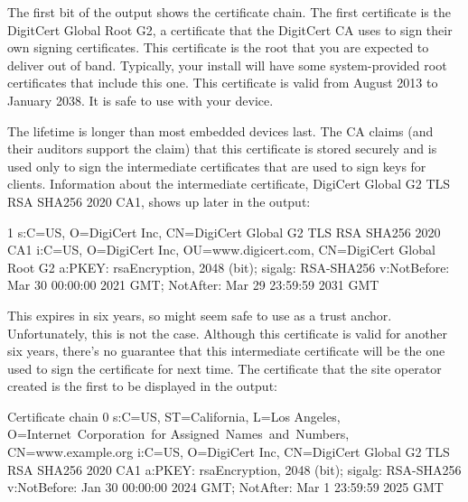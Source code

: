 
The first bit of the output shows the certificate chain.
The first certificate is the DigitCert Global Root G2, a certificate that the DigitCert CA uses to sign their own signing certificates.
This certificate is the root that you are expected to deliver out of band.
Typically, your  install will have some system-provided root certificates that include this one.
This certificate is valid from August 2013 to January 2038.
It is  safe to use with your device.

The lifetime is longer than most embedded devices last.
The CA claims (and their auditors support the claim) that this certificate is stored securely and is used only to sign the intermediate certificates that are used to sign keys for clients.
Information about the intermediate certificate, DigiCert Global G2 TLS RSA SHA256 2020 CA1, shows up later in the output:

\begin{console}
 1 s:C=US, O=DigiCert Inc, CN=DigiCert Global G2 TLS RSA SHA256 2020 CA1
   i:C=US, O=DigiCert Inc, OU=www.digicert.com, CN=DigiCert Global Root G2
   a:PKEY: rsaEncryption, 2048 (bit); sigalg: RSA-SHA256
   v:NotBefore: Mar 30 00:00:00 2021 GMT; NotAfter: Mar 29 23:59:59 2031 GMT
\end{console}

This expires in six years, so might seem safe to use as a trust anchor.
Unfortunately, this is not the case.
Although this certificate is valid for another six years, there's no guarantee that this intermediate certificate will be the one used to sign the certificate for  next time.
The certificate that the site operator created is the first to be displayed in the output:

\begin{console}
Certificate chain
 0 s:C=US, ST=California, L=Los Angeles, O=Internet Corporation for
        Assigned Names and Numbers, CN=www.example.org
   i:C=US, O=DigiCert Inc, CN=DigiCert Global G2 TLS RSA SHA256 2020 CA1
   a:PKEY: rsaEncryption, 2048 (bit); sigalg: RSA-SHA256
   v:NotBefore: Jan 30 00:00:00 2024 GMT; NotAfter: Mar  1 23:59:59 2025 GMT
\end{console}

